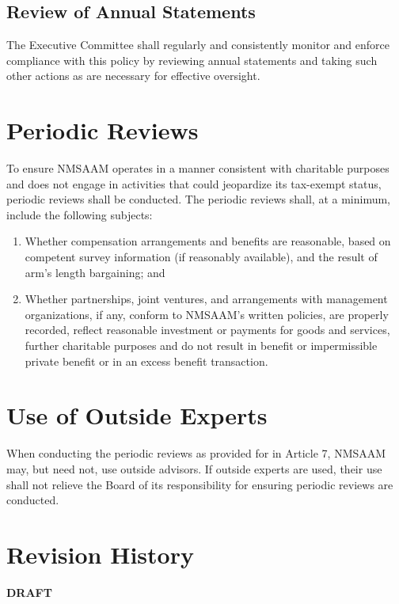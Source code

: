 \documentclass[letterpaper,12pt]{article}
\begin{document}
\subsection{Review of Annual Statements}
\label{sec:org3fe4154}
The Executive Committee shall regularly and consistently monitor
and enforce compliance with this policy by reviewing annual
statements and taking such other actions as are necessary for
effective oversight.
\section{Periodic Reviews}
\label{sec:orge536ba9}
To ensure NMSAAM operates in a manner consistent with charitable
purposes and does not engage in activities that could jeopardize its
tax-exempt status, periodic reviews shall be conducted. The periodic
reviews shall, at a minimum, include the following subjects:
\begin{enumerate}[{7}.1]
\item Whether compensation arrangements and benefits are reasonable,
based on competent survey information (if reasonably available),
and the result of arm's length bargaining; and
\item Whether partnerships, joint ventures, and arrangements with
management organizations, if any, conform to NMSAAM's written
policies, are properly recorded, reflect reasonable investment or
payments for goods and services, further charitable purposes and
do not result in benefit or impermissible private benefit or in
an excess benefit transaction.
\end{enumerate}
\section{Use of Outside Experts}
\label{sec:org67b74d9}
When conducting the periodic reviews as provided for in Article 7,
NMSAAM may, but need not, use outside advisors. If outside experts
are used, their use shall not relieve the Board of its
responsibility for ensuring periodic reviews are conducted.
\section{Revision History}
\label{sec:org1e18672}
\textbf{DRAFT}
\end{document}
